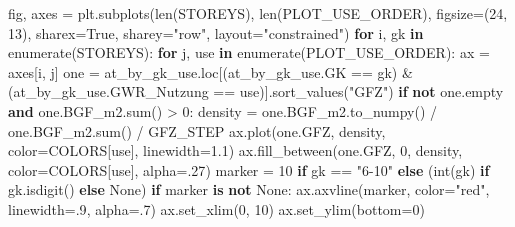 \documentclass[
  ngerman,
  a4paper,
  DIV=11]{scrreprt}
\newenvironment{Shaded}{\begin{snugshade}}{\end{snugshade}}
\newcommand{\BuiltInTok}[1]{\textcolor[rgb]{0.00,0.23,0.31}{#1}}
\newcommand{\ControlFlowTok}[1]{\textcolor[rgb]{0.00,0.23,0.31}{\textbf{#1}}}
\newcommand{\DecValTok}[1]{\textcolor[rgb]{0.68,0.00,0.00}{#1}}
\newcommand{\FloatTok}[1]{\textcolor[rgb]{0.68,0.00,0.00}{#1}}
\newcommand{\KeywordTok}[1]{\textcolor[rgb]{0.00,0.23,0.31}{\textbf{#1}}}
\newcommand{\NormalTok}[1]{\textcolor[rgb]{0.00,0.23,0.31}{#1}}
\newcommand{\OperatorTok}[1]{\textcolor[rgb]{0.37,0.37,0.37}{#1}}
\newcommand{\StringTok}[1]{\textcolor[rgb]{0.13,0.47,0.30}{#1}}
\newcommand{\VariableTok}[1]{\textcolor[rgb]{0.07,0.07,0.07}{#1}}
\begin{document}
\begin{Shaded}
\begin{Highlighting}[]
\NormalTok{fig, axes }\OperatorTok{=}\NormalTok{ plt.subplots(}\BuiltInTok{len}\NormalTok{(STOREYS), }\BuiltInTok{len}\NormalTok{(PLOT\_USE\_ORDER),}
\NormalTok{                         figsize}\OperatorTok{=}\NormalTok{(}\DecValTok{24}\NormalTok{, }\DecValTok{13}\NormalTok{), sharex}\OperatorTok{=}\VariableTok{True}\NormalTok{, sharey}\OperatorTok{=}\StringTok{"row"}\NormalTok{, layout}\OperatorTok{=}\StringTok{"constrained"}\NormalTok{)}
\ControlFlowTok{for}\NormalTok{ i, gk }\KeywordTok{in} \BuiltInTok{enumerate}\NormalTok{(STOREYS):}
    \ControlFlowTok{for}\NormalTok{ j, use }\KeywordTok{in} \BuiltInTok{enumerate}\NormalTok{(PLOT\_USE\_ORDER):}
\NormalTok{        ax }\OperatorTok{=}\NormalTok{ axes[i, j]}
\NormalTok{        one }\OperatorTok{=}\NormalTok{ at\_by\_gk\_use.loc[(at\_by\_gk\_use.GK }\OperatorTok{==}\NormalTok{ gk) }\OperatorTok{\&}
\NormalTok{                               (at\_by\_gk\_use.GWR\_Nutzung }\OperatorTok{==}\NormalTok{ use)].sort\_values(}\StringTok{"GFZ"}\NormalTok{)}
        \ControlFlowTok{if} \KeywordTok{not}\NormalTok{ one.empty }\KeywordTok{and}\NormalTok{ one.BGF\_m2.}\BuiltInTok{sum}\NormalTok{() }\OperatorTok{\textgreater{}} \DecValTok{0}\NormalTok{:}
\NormalTok{            density }\OperatorTok{=}\NormalTok{ one.BGF\_m2.to\_numpy() }\OperatorTok{/}\NormalTok{ one.BGF\_m2.}\BuiltInTok{sum}\NormalTok{() }\OperatorTok{/}\NormalTok{ GFZ\_STEP}
\NormalTok{            ax.plot(one.GFZ, density, color}\OperatorTok{=}\NormalTok{COLORS[use], linewidth}\OperatorTok{=}\FloatTok{1.1}\NormalTok{)}
\NormalTok{            ax.fill\_between(one.GFZ, }\DecValTok{0}\NormalTok{, density, color}\OperatorTok{=}\NormalTok{COLORS[use], alpha}\OperatorTok{=}\FloatTok{.27}\NormalTok{)}
\NormalTok{        marker }\OperatorTok{=} \DecValTok{10} \ControlFlowTok{if}\NormalTok{ gk }\OperatorTok{==} \StringTok{"6{-}10"} \ControlFlowTok{else}\NormalTok{ (}\BuiltInTok{int}\NormalTok{(gk) }\ControlFlowTok{if}\NormalTok{ gk.isdigit() }\ControlFlowTok{else} \VariableTok{None}\NormalTok{)}
        \ControlFlowTok{if}\NormalTok{ marker }\KeywordTok{is} \KeywordTok{not} \VariableTok{None}\NormalTok{:}
\NormalTok{            ax.axvline(marker, color}\OperatorTok{=}\StringTok{"red"}\NormalTok{, linewidth}\OperatorTok{=}\FloatTok{.9}\NormalTok{, alpha}\OperatorTok{=}\FloatTok{.7}\NormalTok{)}
\NormalTok{        ax.set\_xlim(}\DecValTok{0}\NormalTok{, }\DecValTok{10}\NormalTok{)}
\NormalTok{        ax.set\_ylim(bottom}\OperatorTok{=}\DecValTok{0}\NormalTok{)}

\end{Highlighting}
\end{Shaded}
\end{document}
